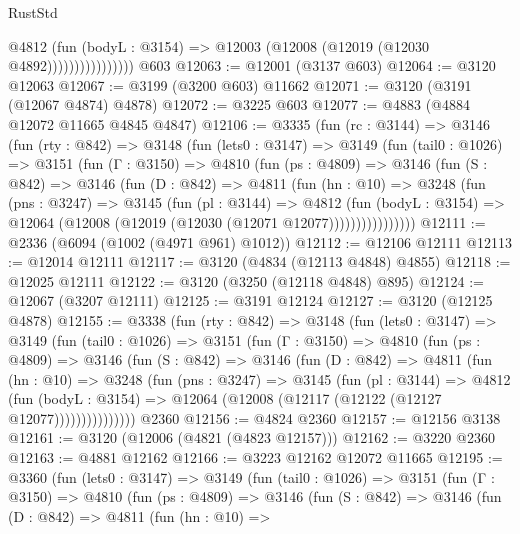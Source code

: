 \begin{lexlean}{RustStd}
\begin{coremodule}
{\begin{coremodule}
{{{{{{{{{{{{{{{{{{{{{{{{{{                          @4812
                            (fun (bodyL : @3154) =>
                            @12003 (@12008 (@12019 (@12030 @4892))))))))))))))))
    @603
@12063 := @12001 (@3137 @603)
@12064 := @3120 @12063
@12067 := @3199 (@3200 @603) @11662
@12071 := @3120 (@3191 (@12067 @4874) @4878)
@12072 := @3225 @603
@12077 := @4883 (@4884 @12072 @11665 @4845 @4847)
@12106 := @3335
    (fun (rc : @3144) =>
    @3146
      (fun (rty : @842) =>
      @3148
        (fun (lets0 : @3147) =>
        @3149
          (fun (tail0 : @1026) =>
          @3151
            (fun (Γ : @3150) =>
            @4810
              (fun (ps : @4809) =>
              @3146
                (fun (S : @842) =>
                @3146
                  (fun (D : @842) =>
                  @4811
                    (fun (hn : @10) =>
                    @3248
                      (fun (pns : @3247) =>
                      @3145
                        (fun (pl : @3144) =>
                        @4812
                          (fun (bodyL : @3154) =>
                          @12064 (@12008 (@12019 (@12030 (@12071 @12077))))))))))))))))
@12111 := @2336 (@6094 (@1002 (@4971 @961) @1012))
@12112 := @12106 @12111
@12113 := @12014 @12111
@12117 := @3120 (@4834 (@12113 @4848) @4855)
@12118 := @12025 @12111
@12122 := @3120 (@3250 (@12118 @4848) @895)
@12124 := @12067 (@3207 @12111)
@12125 := @3191 @12124
@12127 := @3120 (@12125 @4878)
@12155 := @3338
    (fun (rty : @842) =>
    @3148
      (fun (lets0 : @3147) =>
      @3149
        (fun (tail0 : @1026) =>
        @3151
          (fun (Γ : @3150) =>
          @4810
            (fun (ps : @4809) =>
            @3146
              (fun (S : @842) =>
              @3146
                (fun (D : @842) =>
                @4811
                  (fun (hn : @10) =>
                  @3248
                    (fun (pns : @3247) =>
                    @3145
                      (fun (pl : @3144) =>
                      @4812
                        (fun (bodyL : @3154) =>
                        @12064 (@12008 (@12117 (@12122 (@12127 @12077)))))))))))))))
    @2360
@12156 := @4824 @2360
@12157 := @12156 @3138
@12161 := @3120 (@12006 (@4821 (@4823 @12157)))
@12162 := @3220 @2360
@12163 := @4881 @12162
@12166 := @3223 @12162 @12072 @11665
@12195 := @3360
    (fun (lets0 : @3147) =>
    @3149
      (fun (tail0 : @1026) =>
      @3151
        (fun (Γ : @3150) =>
        @4810
          (fun (ps : @4809) =>
          @3146
            (fun (S : @842) =>
            @3146
              (fun (D : @842) =>
              @4811
                (fun (hn : @10) =>
}}}}}}}}}}}}}}}}}}}}}}}}}}
\end{coremodule}}
\end{coremodule}
\end{lexlean}
